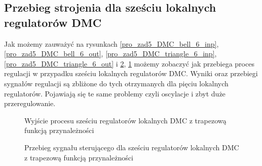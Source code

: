 \subsection{Przebieg strojenia dla sześciu lokalnych regulatorów DMC}
Jak możemy zauważyć na rysunkach \ref{pro_zad5_DMC_bell_6_inp}, \ref{pro_zad5_DMC_bell_6_out}, \ref{pro_zad5_DMC_triangle_6_inp}, \ref{pro_zad5_DMC_triangle_6_out} i \ref{pro_zad5_DMC_trapezoid_6_inp}, \ref{pro_zad5_DMC_trapezoid_6_out} możemy zobaczyć jak przebiega proces regulacji w przypadku sześciu lokalnych regulatorów DMC. Wyniki oraz przebiegi sygnałów regulacji są zbliżone do tych otrzymanych dla pięciu lokalnych regulatorów. Pojawiają się te same problemy czyli oscylacje i zbyt duże przeregulowanie. 
\begin{figure}[t]
    \centering
    \caption{Wyjście procesu sześciu regulatorów lokalnych DMC z trapezową funkcją przynależności}
    \label{pro_zad5_DMC_trapezoid_6_out}
\end{figure}

\begin{figure}[b]
    \centering
    \caption{Przebieg sygnału sterującego dla sześciu regulatorów lokalnych DMC z trapezową funkcją przynależności}
    \label{pro_zad5_DMC_trapezoid_6_inp}
\end{figure}


